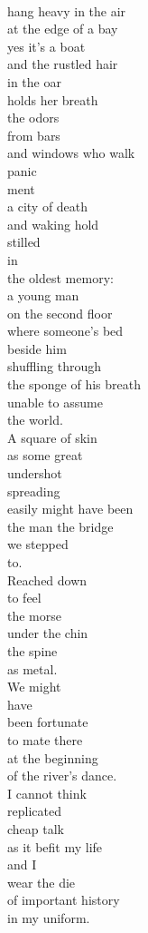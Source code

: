\documentclass[smalldemyvopaper,11pt,twoside,onecolumn,openright,extrafontsizes]{memoir}
\begin{document}
\\hang heavy in the air
\\at the edge of a bay
\\yes it's a boat
\\and the rustled hair
\\in the oar
\\holds her breath
\\the odors
\\from bars
\\and windows who walk
\\panic
\\ment
\\a city of death
\\and waking hold
\\stilled
\\in
\\the oldest memory:
\\a young man
\\on the second floor
\\where someone's bed
\\beside him
\\shuffling through
\\the sponge of his breath
\\unable to assume
\\the world.
\\A square of skin
\\as some great
\\undershot
\\spreading
\\easily might have been
\\the man the bridge
\\we stepped
\\to.
\\Reached down
\\to feel
\\the morse
\\under the chin
\\the spine
\\as metal.
\\We might
\\have
\\been fortunate
\\to mate there
\\at the beginning
\\of the river's dance.
\\I cannot think
\\replicated
\\cheap talk
\\as it befit my life
\\and I
\\wear the die
\\of important history
\\in my uniform.
\end{document}
